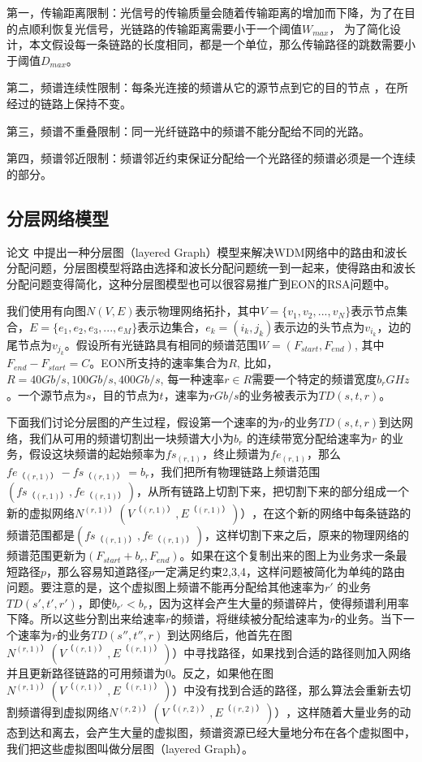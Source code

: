 第一，传输距离限制：光信号的传输质量会随着传输距离的增加而下降，为了在目的点顺利恢复光信号，光链路的传输距离需要小于一个阈值$W_{max}$， 为了简化设计，本文假设每一条链路的长度相同，都是一个单位，那么传输路径的跳数需要小于阈值$D_{max}$。

第二，频谱连续性限制：每条光连接的频谱从它的源节点到它的目的节点 ，在所经过的链路上保持不变。

第三，频谱不重叠限制：同一光纤链路中的频谱不能分配给不同的光路。

第四，频谱邻近限制：频谱邻近约束保证分配给一个光路径的频谱必须是一个连续的部分。
\subsection{分层网络模型}
论文 中提出一种分层图（layered Graph）模型来解决WDM网络中的路由和波长分配问题，分层图模型将路由选择和波长分配问题统一到一起来，使得路由和波长分配问题变得简化，这种分层图模型也可以很容易推广到EON的RSA问题中。

我们使用有向图$N(V,E)$表示物理网络拓扑，其中$V=\{v_1,v_2,...,v_N\}$表示节点集合，$E=\{e_1,e_2,e_3,...,e_M\}$表示边集合，$e_k=(i_k,j_k)$表示边的头节点为$v_{i_k}$，边的尾节点为$v_{j_k}$。假设所有光链路具有相同的频谱范围$W=(F_{start},F_{end})$, 其中$F_{end}-F_{start}=C$。EON所支持的速率集合为$R$, 比如，$R={40Gb/s,100Gb/s,400Gb/s}$, 每一种速率$r\in R$需要一个特定的频谱宽度$b_r GHz$。一个源节点为$s$，目的节点为$t$，速率为$r Gb/s$的业务被表示为$TD(s,t,r)$。

下面我们讨论分层图的产生过程，假设第一个速率的为$r$的业务$TD(s,t,r)$到达网络，我们从可用的频谱切割出一块频谱大小为$b_r$ 的连续带宽分配给速率为$r$ 的业务，假设这块频谱的起始频率为$fs_{( r,1 )}$，终止频谱为$fe_{( r,1 )}$，那么$fe_{（ (r,1) ）}-fs_{（ (r,1) ）}=b_r$，我们把所有物理链路上频谱范围$( fs_{（ (r,1) ）},fe_{（ (r,1) ）} )$，从所有链路上切割下来，把切割下来的部分组成一个新的虚拟网络$N^{( r,1) ）} ( V^{（ (r,1) ）},E^{（ (r,1) ）}) ）$，在这个新的网络中每条链路的频谱范围都是$(fs_{（ (r,1) ）},fe_{（ (r,1) ）})$，这样切割下来之后，原来的物理网络的频谱范围更新为$( F_{start}+b_r,F_{end} )$。如果在这个复制出来的图上为业务求一条最短路径$p$，那么容易知道路径$p$一定满足约束2,3,4，这样问题被简化为单纯的路由问题。要注意的是，这个虚拟图上频谱不能再分配给其他速率为$r'$ 的业务$TD(s',t',r')$，即使$b_{r'}<b_r$，因为这样会产生大量的频谱碎片，使得频谱利用率下降。所以这些分割出来给速率$r$的频谱，将继续被分配给速率为$r$的业务。当下一个速率为$r$的业务$TD (s'',t'',r)$ 到达网络后，他首先在图$N^{( r,1) ）} ( V^{（ (r,1) ）},E^{（ (r,1) ）}) ）$中寻找路径，如果找到合适的路径则加入网络并且更新路径链路的可用频谱为0。反之，如果他在图$N^{( r,1) ）} ( V^{（ (r,1) ）},E^{（ (r,1) ）}) ）$中没有找到合适的路径，那么算法会重新去切割频谱得到虚拟网络$N^{( r,2) ）} ( V^{（ (r,2) ）},E^{（ (r,2) ）}) ）$，这样随着大量业务的动态到达和离去，会产生大量的虚拟图，频谱资源已经大量地分布在各个虚拟图中，我们把这些虚拟图叫做分层图（layered Graph）。

